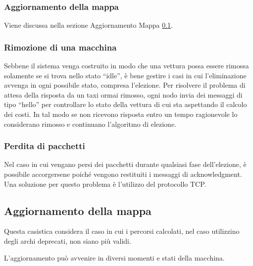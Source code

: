 \subsubsection{Aggiornamento della mappa}
Viene discussa nella sezione Aggiornamento Mappa \ref{aggiornamento_mappa}.

\subsubsection{Rimozione di una macchina}
Sebbene il sistema venga costruito in modo che una vettura possa essere rimossa solamente se si trova nello stato ``idle'', è bene gestire i casi in cui l'eliminazione avvenga in ogni possibile stato, compresa l'elezione. Per risolvere il problema di attesa della risposta da un taxi ormai rimosso, ogni nodo invia dei messaggi di tipo ``hello'' per controllare lo stato della vettura di cui sta aspettando il calcolo dei costi. In tal modo se non ricevono risposta entro un tempo ragionevole lo considerano rimosso e continuano l'algoritmo di elezione.

\subsubsection{Perdita di pacchetti}
Nel caso in cui vengano persi dei pacchetti durante qualsiasi fase dell'elezione, è possibile accorgersene poiché vengono restituiti i messaggi di acknowledgment. Una soluzione per questo problema è l'utilizzo del protocollo TCP.

\subsection{Aggiornamento della mappa}\label{aggiornamento_mappa}

Questa casistica considera il caso in cui i percorsi calcolati, nel caso utilizzino degli archi deprecati, non siano più validi. 

L'aggiornamento può avvenire in diversi momenti e stati della macchina. 

